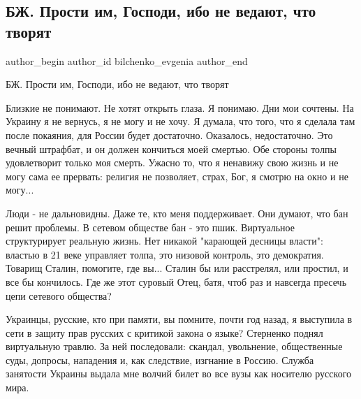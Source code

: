 
 
 
 
 

\subsection{БЖ. Прости им, Господи, ибо не ведают, что творят}
\label{sec:20_12_2021.tg.bilchenko_evgenia.1.prosti_im_gospodi}

\ifcmt
 author_begin
   author_id bilchenko_evgenia
 author_end
\fi

БЖ. Прости им, Господи, ибо не ведают, что творят

Близкие не понимают. Не хотят открыть глаза. Я понимаю. Дни мои сочтены. На
Украину я не вернусь, я не могу и не хочу. Я думала, что того, что я сделала
там после покаяния, для России будет достаточно. Оказалось, недостаточно. Это
вечный штрафбат, и он должен кончиться моей смертью. Обе стороны толпы
удовлетворит только моя смерть. Ужасно то, что я ненавижу свою жизнь и не могу
сама ее прервать: религия не позволяет, страх, Бог, я смотрю на окно и не
могу... 


Люди - не дальновидны. Даже те, кто меня поддерживает. Они думают, что бан
решит проблемы. В сетевом обществе бан - это пшик. Виртуальное структурирует
реальную жизнь. Нет никакой "карающей десницы власти": властью в 21 веке
управляет толпа, это низовой контроль, это демократия. Товарищ Сталин,
помогите, где вы... Сталин бы или расстрелял, или простил, и все бы кончилось.
Где же этот суровый Отец, батя, чтоб раз и навсегда пресечь цепи сетевого
общества?

Украинцы, русские, кто при памяти, вы помните, почти год назад, я выступила в
сети в защиту прав русских с критикой закона о языке? Стерненко поднял
виртуальную травлю. За ней последовали: скандал, увольнение, общественные суды,
допросы, нападения и, как следствие, изгнание в Россию. Служба занятости
Украины выдала мне волчий билет во все вузы как носителю русского мира.

